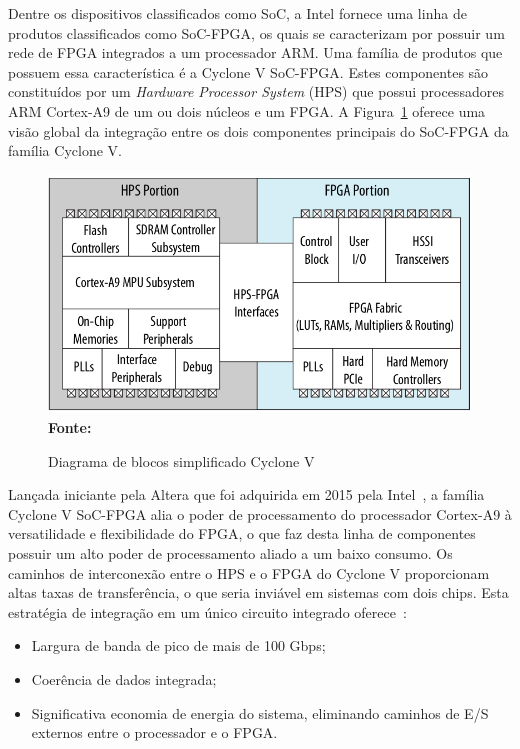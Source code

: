 
Dentre os dispositivos classificados como SoC, a Intel fornece uma linha de produtos classificados como SoC-FPGA, os quais se caracterizam por possuir um rede de FPGA integrados a um processador ARM\@. Uma família de produtos que possuem essa característica é a Cyclone V SoC-FPGA\@. Estes componentes são constituídos por um \textit{Hardware Processor System} (HPS) que possui processadores ARM Cortex-A9 de um ou dois núcleos e um FPGA\@. A Figura~\ref{fig:socfpga} oferece uma visão global da integração entre os dois componentes principais do SoC-FPGA da família Cyclone V. 

\begin{figure}[ht]
	\caption{Diagrama de blocos simplificado Cyclone V}
	\begin{center}
		\includegraphics[scale=0.46]{imagens/socfpga.png}\\
		{\small \textbf{Fonte:} }
    \end{center}\label{fig:socfpga}
\end{figure}

Lançada iniciante pela Altera que foi adquirida em 2015 pela Intel~\cite{intelbuyaltera}, a família Cyclone V SoC-FPGA alia o poder de processamento do processador Cortex-A9 à versatilidade e flexibilidade do FPGA, o que faz desta linha de componentes possuir um alto poder de processamento aliado a um baixo consumo. Os caminhos de interconexão entre o HPS e o FPGA do Cyclone V proporcionam altas taxas de transferência, o que seria inviável em sistemas com dois chips. Esta estratégia de integração em um único circuito integrado oferece~\cite{CycloneV}:

\begin{itemize}
    \item Largura de banda de pico de mais de 100 Gbps;
    \item Coerência de dados integrada;
    \item Significativa economia de energia do sistema, eliminando caminhos de E/S externos entre o processador e o FPGA\@.
\end{itemize}

